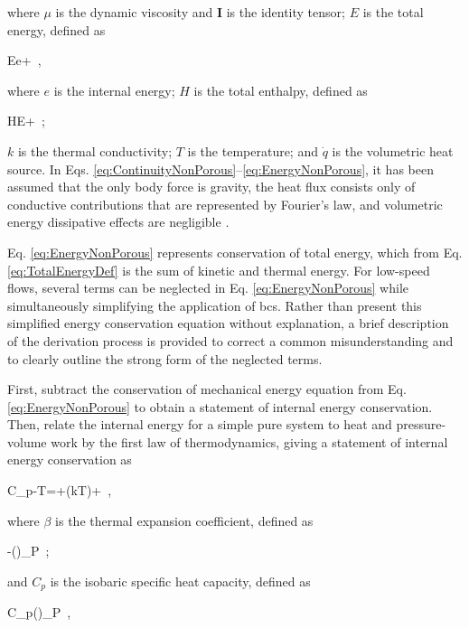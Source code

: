 \noindent where \(\mu\) is the dynamic viscosity and \(\textbf{I}\) is the identity tensor; \(E\) is the total energy, defined as

\beq
\label{eq:TotalEnergyDef}
E\equiv e+\cdot{}\ ,
\eeq

\noindent where \(e\) is the internal energy; \(H\) is the total enthalpy, defined as

\beq
\label{eq:TotalEnthalpyDef}
H\equiv E+\ ;
\eeq

\noindent \(k\) is the thermal conductivity; \(T\) is the temperature; and \(\dot{q}\) is the volumetric heat source. In Eqs. \eqref{eq:ContinuityNonPorous}--\eqref{eq:EnergyNonPorous}, it has been assumed that the only body force is gravity, the heat flux consists only of conductive contributions that are represented by Fourier's law, and volumetric energy dissipative effects are negligible \cite{batchelor}.

Eq. \eqref{eq:EnergyNonPorous} represents conservation of total energy, which from Eq. \eqref{eq:TotalEnergyDef} is the sum of kinetic and thermal energy. For low-speed flows, several terms can be neglected in Eq. \eqref{eq:EnergyNonPorous} while simultaneously simplifying the application of \glspl{bc}. Rather than present this simplified energy conservation equation without explanation, a brief description of the derivation process is provided to correct a common misunderstanding and to clearly outline the strong form of the neglected terms.

First, subtract the conservation of mechanical energy equation from Eq. \eqref{eq:EnergyNonPorous} to obtain a statement of internal energy conservation. Then, relate the internal energy for a simple pure system to heat and pressure-volume work by the first law of thermodynamics, giving a statement of internal energy conservation as

\beq
\label{eq:InternalEnergy}
\rho C_{p}-\beta T=\tau\colon\nabla{}+\nabla\cdot(k\nabla T)+\ ,
\eeq

\noindent where \(\beta\) is the thermal expansion coefficient, defined as

\beq
\label{eq:BetaDef}
\beta\equiv-\left(\right)_P\ ;
\eeq

\noindent and \(C_p\) is the isobaric specific heat capacity, defined as

\beq
\label{eq:CpDef}
C_p\equiv\left(\right)_P\ ,
\eeq

